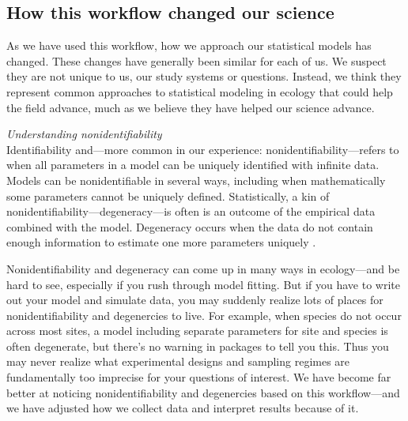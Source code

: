 \documentclass[11pt]{article}
\begin{document}
{\subsection*{How this workflow changed our science} %

As we have used this workflow, how we approach our statistical models has changed. These changes have generally been similar for each of us. We suspect they are not unique to us, our study systems or questions. Instead, we think they represent common approaches to statistical modeling in ecology that could help the field advance, much as we believe they have helped our science advance. 

 \emph{Understanding nonidentifiability} \\
Identifiability and---more common in our experience: nonidentifiability---refers to when all parameters in a model can be uniquely identified with infinite data. Models can be nonidentifiable in several ways, including when mathematically some parameters cannot be uniquely defined. Statistically, a kin of nonidentifiability---degeneracy---is often is an outcome of the empirical data combined with the model. Degeneracy occurs when the data do not contain enough information to estimate one more parameters uniquely \citep{gelmanhill}. 

Nonidentifiability and degeneracy can come up in many ways in ecology---and be hard to see, especially if you rush through model fitting. But if you have to write out your model and simulate data, you may suddenly realize lots of places for nonidentifiability and degenercies to live. For example, when species do not occur across most sites, a model including separate parameters for site and species is often degenerate, but there's no warning in packages to tell you this. Thus you may never realize what experimental designs and sampling regimes are fundamentally too imprecise for your questions of interest. We have become far better at noticing nonidentifiability and degenercies based on this workflow---and we have adjusted how we collect data and interpret results because of it. %

}
\end{document}
